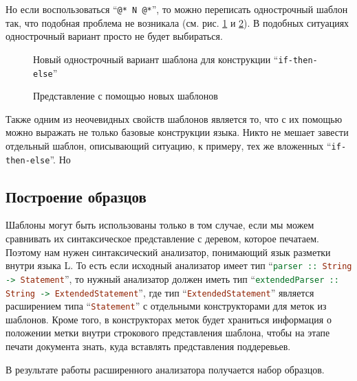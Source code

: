 Но если воспользоваться “\lstinline{@* N @*}”, то можно переписать однострочный шаблон так, что подобная проблема не возникала (см. рис. \ref{fig:flatGoodIfTmplt} и \ref{fig:nestedIfCode}). В подобных ситуациях однострочный вариант просто не будет выбираться.

\begin{figure}[h!]
	
	\caption{Новый однострочный вариант шаблона для конструкции “\lstinline{if-then-else}”}
	\label{fig:flatGoodIfTmplt}	
\end{figure}

\begin{figure}[h!]
	\centering
	
	\caption{Представление с помощью новых шаблонов}
	\label{fig:nestedIfCode}
\end{figure}

Также одним из неочевидных свойств шаблонов является то, что с их помощью можно выражать не только базовые конструкции языка. Никто не мешает завести отдельный шаблон, описывающий ситуацию, к примеру, тех же вложенных “\lstinline{if-then-else}”. Но 

\subsection{Построение образцов}

Шаблоны могут быть использованы только в том случае, если мы можем сравнивать их синтаксическое представление с деревом, которое печатаем. Поэтому нам нужен синтаксический анализатор, понимающий язык разметки внутри языка L. То есть если исходный анализатор имеет тип “\lstinline[language=Haskell]{parser :: String -> Statement}”, то нужный анализатор должен иметь тип “\lstinline[language=Haskell]{extendedParser :: String -> ExtendedStatement}”, где тип “\lstinline[language=Haskell]{ExtendedStatement}” является расширением типа “\lstinline[language=Haskell]{Statement}” с отдельными конструкторами для меток из шаблонов. Кроме того, в конструкторах меток будет храниться информация о положении метки внутри строкового представления шаблона, чтобы на этапе печати документа знать, куда вставлять представления поддеревьев.

В результате работы расширенного анализатора получается набор образцов.


% 	

